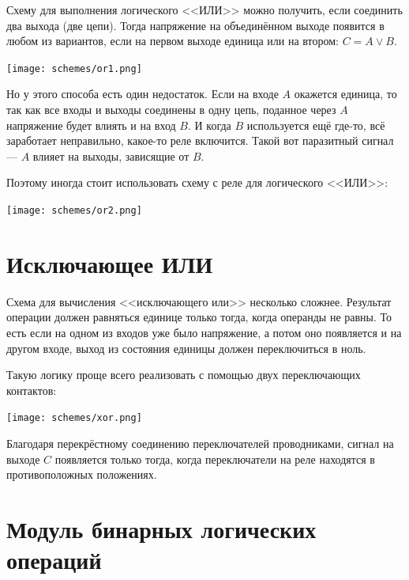 Схему для выполнения логического <<ИЛИ>> можно получить, если соединить два выхода
(две цепи). Тогда напряжение на объединённом выходе появится в любом
из вариантов, если на первом выходе единица или на втором: $C = A \lor B$.

\begin{center}
\texttt{[image: schemes/or1.png]}
\end{center}

Но у этого способа есть один недостаток. Если на входе $A$ окажется единица,
то так как все входы и выходы соединены в одну цепь, поданное через $A$ напряжение
будет влиять и на вход $B$. И когда $B$ используется ещё где-то,
всё заработает неправильно, какое-то реле включится.
Такой вот паразитный сигнал --- $A$ влияет на выходы, зависящие от $B$.

Поэтому иногда стоит использовать схему с реле для логического <<ИЛИ>>:

\begin{center}
\texttt{[image: schemes/or2.png]}
\end{center}


\section{Исключающее ИЛИ}

Схема для вычисления <<исключающего или>> несколько сложнее.
Результат операции должен равняться единице только тогда,
когда операнды не равны. То есть если на одном из входов уже
было напряжение, а потом оно появляется и на другом входе,
выход из состояния единицы должен переключиться в ноль.

Такую логику проще всего реализовать с помощью двух переключающих контактов:

\begin{center}
\texttt{[image: schemes/xor.png]}
\end{center}

Благодаря перекрёстному соединению переключателей проводниками,
сигнал на выходе $C$ появляется только тогда, когда переключатели на реле
находятся в противоположных положениях.

\section{Модуль бинарных логических операций}


